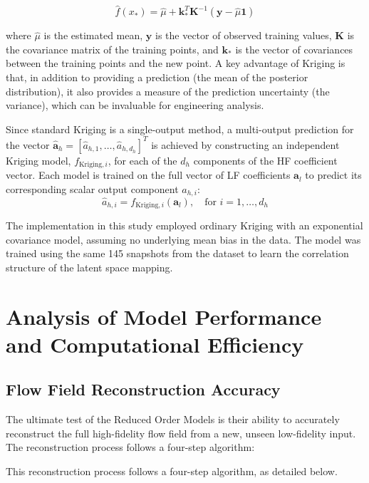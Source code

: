 \documentclass[tg, EN]{ufabcFHZh_tg}
\begin{document}
\begin{equation}
\hat{f}(x_*) = \hat{\mu} + \mathbf{k}_*^T \mathbf{K}^{-1} (\mathbf{y} - \hat{\mu}\mathbf{1})
\end{equation}

where $\hat{\mu}$ is the estimated mean, $\mathbf{y}$ is the vector of observed training values, $\mathbf{K}$ is the covariance matrix of the training points, and $\mathbf{k}_*$ is the vector of covariances between the training points and the new point. A key advantage of Kriging is that, in addition to providing a prediction (the mean of the posterior distribution), it also provides a measure of the prediction uncertainty (the variance), which can be invaluable for engineering analysis.

Since standard Kriging is a single-output method, a multi-output prediction for the vector $\hat{\mathbf{a}}_h = [\hat{a}_{h,1}, \dots, \hat{a}_{h,d_h}]^T$ is achieved by constructing an independent Kriging model, $f_{\text{Kriging}, i}$, for each of the $d_h$ components of the HF coefficient vector. Each model is trained on the full vector of LF coefficients $\mathbf{a}_l$ to predict its corresponding scalar output component $a_{h,i}$:
\begin{equation}
    \hat{a}_{h,i} = f_{\text{Kriging}, i}(\mathbf{a}_l), \quad \text{for } i=1, \dots, d_h
\end{equation}

The implementation in this study employed ordinary Kriging with an exponential covariance model, assuming no underlying mean bias in the data. The model was trained using the same 145 snapshots from the dataset to learn the correlation structure of the latent space mapping.


\chapter{Analysis of Model Performance and Computational Efficiency}
\label{chap:results_discussion}

\section{Flow Field Reconstruction Accuracy}

The ultimate test of the Reduced Order Models is their ability to accurately reconstruct the full high-fidelity flow field from a new, unseen low-fidelity input. The reconstruction process follows a four-step algorithm:

This reconstruction process follows a four-step algorithm, as detailed below.
\end{document}
